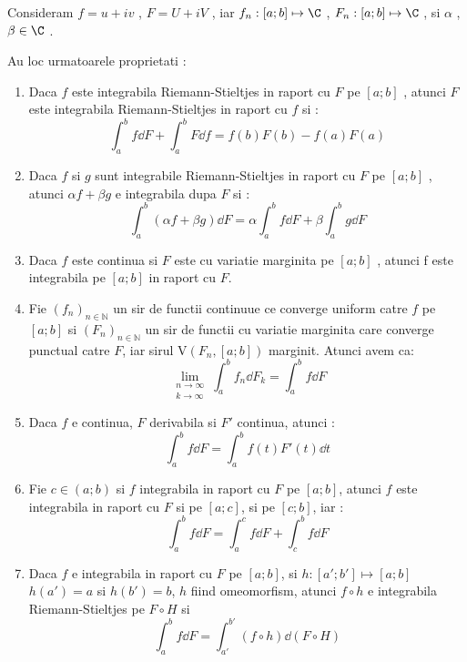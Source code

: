 \begin{theorem}
    Consideram  $f=u+iv$ ,  $F=U+iV$ , iar $f_n : [a;b] \mapsto \C$ , $F_n : [a;b]\mapsto \C$ ,
     si $\alpha$ , $\beta \in \C$ .

    Au loc urmatoarele proprietati :
    \begin{enumerate}
        \item Daca $f$ este integrabila Riemann-Stieltjes in raport cu $F$ pe $[a;b]$ , atunci $F$ este integrabila
            Riemann-Stieltjes in raport cu $f$ si :
            \[
                \int_a^b f \dd F + \int_a^b F \dd f = f(b) F(b) -f(a)F(a)
            \]
        \item Daca $f$ si $g$ sunt integrabile Riemann-Stieltjes in raport cu $F$ pe $[a;b]$ , atunci
            $\alpha f + \beta g$ e integrabila dupa $F$ si :
            \[
               \int_a^b (\alpha f + \beta g) \dd F = \alpha \int_a^b f \dd F + \beta \int_a^b g \dd F
            \]
        \item Daca $f$ este continua si $F$ este cu variatie marginita pe $[a;b]$ , atunci f este
            integrabila pe $[a;b]$ in raport cu $F$.
        \item Fie $(f_n)_{n \in \mathbb{N}}$ un sir de functii continuue ce converge uniform catre
            $f$ pe $[a;b]$ si $(F_n)_{n \in \mathbb{N}}$ un sir de functii cu variatie marginita
            care converge punctual catre $F$, iar sirul $\mathrm{V}(F_n, [a;b])$ marginit.
            Atunci avem ca:
            \[
                \lim_{\substack{
                        n \to \infty \\
                        k \to \infty
                    }} \int_a^b f_n \dd F_k = \int_a^b f \dd F
            \]
        \item Daca $f$ e continua, $F$ derivabila si $F'$ continua, atunci :
            \[
                \int_a^b f \dd F = \int_a^b f(t) F'(t) \dd t
            \]
        \item Fie $c \in (a;b)$ si $f$ integrabila in raport cu $F$ pe $[a;b]$, atunci $f$
            este integrabila in raport cu $F$ si pe $[a;c]$, si pe $[c;b]$, iar :
            \[
                \int_a^b f \dd F = \int_a^c f \dd F + \int_c^b f \dd F
            \]
        \item Daca $f$ e integrabila in raport cu $F$ pe $[a;b]$, si $h:[a';b'] \mapsto [a;b]$
            $h(a')=a$ si $h(b')=b$, $h$ fiind omeomorfism, atunci $f \circ h$ e integrabila Riemann-Stieltjes pe
            $F \circ H$ si
            \[ \int_a^b f \dd F = \int_{a'}^{b'} (f \circ h) \dd (F \circ H)  \]
    \end{enumerate}
\end{theorem}

